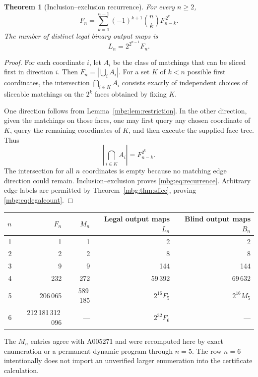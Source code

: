 \documentclass[11pt,letterpaper]{article}
\newtheorem{theorem}{Theorem}[section]
\theoremstyle{definition}
\begin{document}
\begin{theorem}[Inclusion--exclusion recurrence]
\label{mbg:thm:recurrence}
For every $n\ge2$,
\begin{equation}
 F_n=\sum_{k=1}^{n-1}(-1)^{k+1}\binom nk F_{n-k}^{\,2^k}.
 \label{mbg:eq:recurrence}
\end{equation}
The number of distinct legal binary output maps is
\begin{equation}
 L_n=2^{2^{n-1}}F_n.
 \label{mbg:eq:legalcount}
\end{equation}
\end{theorem}
\begin{proof}
For each coordinate $i$, let $A_i$ be the class of matchings that can be sliced first in direction $i$. Then $F_n=|\bigcup_i A_i|$. For a set $K$ of $k<n$ possible first coordinates, the intersection $\bigcap_{i\in K}A_i$ consists exactly of independent choices of sliceable matchings on the $2^k$ faces obtained by fixing $K$.

One direction follows from Lemma~\ref{mbg:lem:restriction}. In the other direction, given the matchings on those faces, one may first query any chosen coordinate of $K$, query the remaining coordinates of $K$, and then execute the supplied face tree. Thus
\[
 \left|\bigcap_{i\in K}A_i\right|=F_{n-k}^{2^k}.
\]
The intersection for all $n$ coordinates is empty because no matching edge direction could remain. Inclusion--exclusion proves \eqref{mbg:eq:recurrence}. Arbitrary edge labels are permitted by Theorem~\ref{mbg:thm:slice}, proving \eqref{mbg:eq:legalcount}.
\end{proof}

\begin{center}
\begin{tabular}{rrrrr}
\toprule
$n$ & $F_n$ & $M_n$ & Legal output maps $L_n$ & Blind output maps $B_n$\\
\midrule
1 & 1 & 1 & 2 & 2\\
2 & 2 & 2 & 8 & 8\\
3 & 9 & 9 & 144 & 144\\
4 & 232 & 272 & 59\,392 & 69\,632\\
5 & 206\,065 & 589\,185 & $2^{16}F_5$ & $2^{16}M_5$\\
6 & 212\,181\,312\,096 & --- & $2^{32}F_6$ & ---\\
\bottomrule
\end{tabular}
\end{center}

The $M_n$ entries agree with A005271 \cite{OEIS} and were recomputed here by exact enumeration or a permanent dynamic program through $n=5$. The row $n=6$ intentionally does not import an unverified larger enumeration into the certificate calculation.
\end{document}

